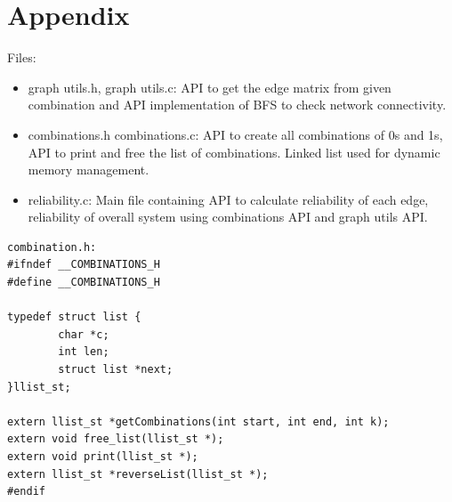 \documentclass[11pt]{article}
\begin{document}
\section{Appendix}
Files:
\begin{itemize}
\item graph utils.h, graph utils.c: API to get the edge matrix from given combination and API implementation of BFS to check network connectivity.
\item combinations.h combinations.c: API to create all combinations of 0s and 1s, API to print and free the list of combinations. Linked list used for dynamic memory management.
\item reliability.c: Main file containing API to calculate reliability of each edge, reliability of overall system using combinations API and graph utils API.
\end{itemize}
\begin{lstlisting}
combination.h:
#ifndef __COMBINATIONS_H
#define __COMBINATIONS_H

typedef struct list {
        char *c;
        int len;
        struct list *next;
}llist_st;

extern llist_st *getCombinations(int start, int end, int k);
extern void free_list(llist_st *);
extern void print(llist_st *);
extern llist_st *reverseList(llist_st *);
#endif
\end{lstlisting}
\end{document}
